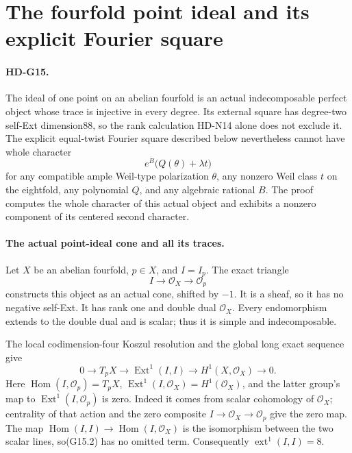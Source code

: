 \section{The fourfold point ideal and its explicit Fourier square}

\paragraph{HD-G15.}
The ideal of one point on an abelian fourfold is an actual
indecomposable perfect object whose trace is injective in
every degree. Its external square has degree-two self-Ext
dimension88, so the rank calculation HD-N14 alone does not
exclude it. The explicit equal-twist Fourier square described
below nevertheless cannot have whole character
\[
                  e^B\bigl(Q(\theta)+\lambda t\bigr)       \tag{G15.1}
\]
for any compatible ample Weil-type polarization $\theta$,
any nonzero Weil class $t$ on the eightfold, any polynomial
$Q$, and any algebraic rational $B$. The proof computes the
whole character of this actual object and exhibits a
nonzero component of its centered second character.

\paragraph{The actual point-ideal cone and all its traces.}
Let $X$ be an abelian fourfold, $p\in X$, and $I=I_p$.
The exact triangle
\[
                  I\longrightarrow\mathcal O_X
                      \longrightarrow\mathcal O_p
\]
constructs this object as an actual cone, shifted by $-1$.
It is a sheaf, so it has no negative self-Ext. It has rank
one and double dual $\mathcal O_X$. Every endomorphism
extends to the double dual and is scalar; thus it is simple
and indecomposable.

The local codimension-four Koszul resolution and the global
long exact sequence give
\[
 0\longrightarrow T_pX\longrightarrow\operatorname{Ext}^1(I,I)
        \longrightarrow H^1(X,\mathcal O_X)\longrightarrow0.
                                                               \tag{G15.2}
\]
Here $\operatorname{Hom}(I,\mathcal O_p)=T_pX$,
$\operatorname{Ext}^1(I,\mathcal O_X)=H^1(\mathcal O_X)$,
and the latter group's map to
$\operatorname{Ext}^1(I,\mathcal O_p)$ is zero. Indeed it
comes from scalar cohomology of $\mathcal O_X$; centrality
of that action and the zero composite
$I\to\mathcal O_X\to\mathcal O_p$ give the zero map.
The map
$\operatorname{Hom}(I,I)\to\operatorname{Hom}(I,\mathcal O_X)$
is the isomorphism between the two scalar lines, so(G15.2)
has no omitted term.
Consequently $\operatorname{ext}^1(I,I)=8$.

